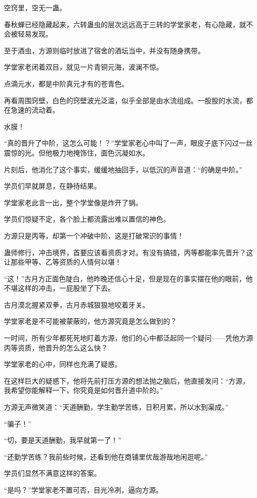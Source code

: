 \begin{this_body}
空窍里，空无一蛊。

春秋蝉已经隐藏起来，六转蛊虫的层次远远高于三转的学堂家老，有心隐藏，就不会被轻易发现。

至于酒虫，方源则临时放进了宿舍的酒坛当中，并没有随身携带。

学堂家老闭着双目，就见一片青铜元海，波澜不惊。

点滴元水，都是中阶真元才有的苍青色。

再看周围窍壁，白色的窍壁波光泛滥，似乎全部是由水流组成。一股股的水流，都在急速的流动着。

水膜！

“真的晋升了中阶，这怎么可能！？”学堂家老心中叫了一声，眼皮子底下闪过一丝震惊的光。但他极力地掩饰住，面色沉凝如水。

片刻后，他消化了这个事实，缓缓地抽回手，以低沉的声音道：“的确是中阶。”

学员们早就屏息，在静待结果。

学堂家老此言一出，整个学堂像是炸开了锅。

学员们惊疑不定，各个脸上都流露出难以置信的神色。

方源只是丙等，却第一个冲破中阶，这是打破常识的事情！

蛊师修行，冲击境界，首要应该看资质才对。有没有搞错，丙等都能率先晋升？这让那些甲等、乙等资质的人情何以堪！

“这！”古月方正面色陡白，他昨晚还信心十足，但是现在的事实摆在他的眼前，他不堪这样的冲击，一屁股坐了下去。

古月漠北握紧双拳，古月赤城狠狠地咬着牙关。

学堂家老是不可能被蒙蔽的，他方源究竟是怎么做到的？

一时间，所有少年都死死地盯着方源，他们的心中都泛起同一个疑问——凭他方源丙等资质，他晋升的怎么这么快？

学堂家老的心中，同样也充满了疑惑。

在这样巨大的疑惑下，他将先前打压方源的想法抛之脑后，他直接发问：“方源，我希望你能解释一下，你究竟是如何晋升道中阶的。”

方源无声微笑道：“天道酬勤，学生勤学苦练，日积月累，所以水到渠成。”

“骗子！”

“切，要是天道酬勤，我早就第一了！”

“还勤学苦练？我前些时候，还看到他在商铺里优哉游哉地闲逛呢。”

学员们显然不满意这样的答案。

“是吗？”学堂家老不置可否，目光冷冽，逼向方源。


\end{this_body}
